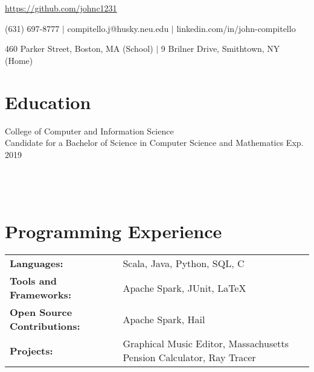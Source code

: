 \documentclass[12pt]{john_resume}
\begin{document}
\centerline{\url{https://github.com/johnc1231}}
\centerline{(631) 697-8777 $|$ compitello.j@husky.neu.edu $|$ linkedin.com/in/john-compitello}
\centerline{460 Parker Street, Boston, MA (School) $|$ 9 Brilner Drive, Smithtown, NY (Home)}

\section{Education}
College of Computer and Information Science\\
Candidate for a Bachelor of Science in Computer Science and Mathematics \hspace*{\fill} Exp. 2019 \\
 \\
\\
 \\

\section{Programming Experience}
\begin{tabular}{l l}
\textbf{Languages:} & Scala, Java, Python, SQL, C\\
\textbf{Tools and Frameworks:} & Apache Spark, JUnit, LaTeX \\
\textbf{Open Source Contributions:} & Apache Spark, Hail \\
\textbf{Projects:} & Graphical Music Editor, Massachusetts Pension Calculator, Ray Tracer
\end{tabular}
\end{document}
